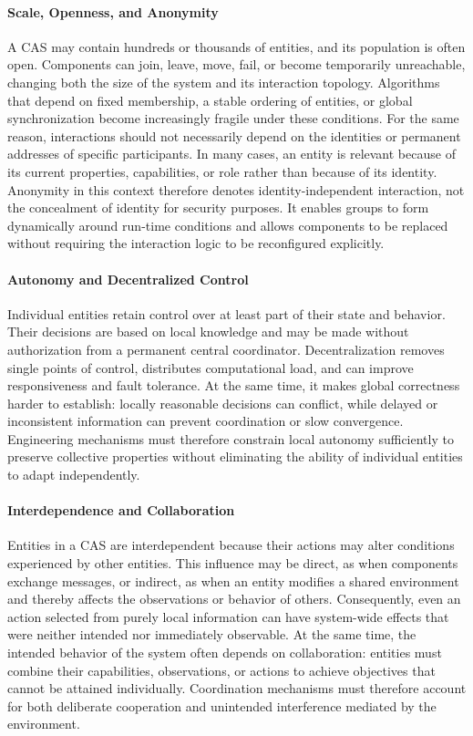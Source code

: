 \paragraph{Scale, Openness, and Anonymity}
A \gls{CAS} may contain hundreds or thousands of entities, and its population
 is often open.
%
Components can join, leave, move, fail, or become temporarily unreachable,
 changing both the size of the system and its interaction topology.
%
Algorithms that depend on fixed membership, a stable ordering of entities,
 or global synchronization become increasingly fragile under these conditions.
%
For the same reason, interactions should not necessarily depend on the
 identities or permanent addresses of specific participants.
%
In many cases, an entity is relevant because of its current properties,
 capabilities, or role rather than because of its identity.
%
Anonymity in this context therefore denotes identity-independent interaction,
 not the concealment of identity for security purposes.
%
It enables groups to form dynamically around run-time conditions and allows
 components to be replaced without requiring the interaction logic to be
 reconfigured explicitly.

\paragraph{Autonomy and Decentralized Control}
Individual entities retain control over at least part of their state and
 behavior.
%
Their decisions are based on local knowledge and may be made without
 authorization from a permanent central coordinator.
%
Decentralization removes single points of control, distributes computational
 load, and can improve responsiveness and fault tolerance.
%
At the same time, it makes global correctness harder to establish:
 locally reasonable decisions can conflict, while delayed or inconsistent
 information can prevent coordination or slow convergence.
%
Engineering mechanisms must therefore constrain local autonomy sufficiently
 to preserve collective properties without eliminating the ability of
 individual entities to adapt independently.

\paragraph{Interdependence and Collaboration}
Entities in a \gls{CAS} are interdependent because their actions may alter
 conditions experienced by other entities.
%
This influence may be direct, as when components exchange messages, or
 indirect, as when an entity modifies a shared environment and thereby affects
 the observations or behavior of others.
%
Consequently, even an action selected from purely local information can have
 system-wide effects that were neither intended nor immediately observable.
%
At the same time, the intended behavior of the system often depends on
 collaboration: entities must combine their capabilities, observations, or
 actions to achieve objectives that cannot be attained individually.
%
Coordination mechanisms must therefore account for both deliberate cooperation
 and unintended interference mediated by the environment.

